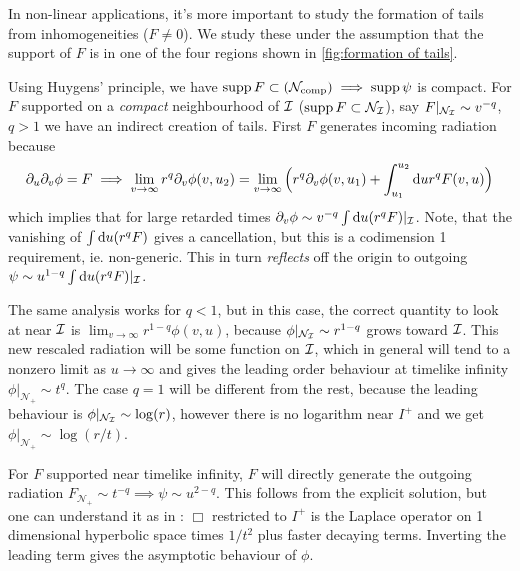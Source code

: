 \documentclass[11pt, oneside]{amsart}
\begin{document}
	In non-linear applications, it's more important to study the formation of tails from inhomogeneities ($F\neq0$). We study these under the assumption that the support of $F$ is in one of the four regions shown in \cref{fig:formation of tails}. 
	
	Using Huygens' principle, we have $\operatorname{supp} F \subset(\mathcal{N}_{\text{comp}})\implies\operatorname{supp}\psi$ is compact. For $F$ supported on a \textit{compact} neighbourhood of  $\mathcal{I}$ ($\operatorname{supp} F\subset \mathcal{N}_{\mathcal{I}}$), say $F|_{\mathcal{N}_{\mathcal{I}}}\sim v^{-q}$, $q>1$ we have an indirect creation of tails. First $F$ generates incoming radiation because 
	\begin{equation*}
		\begin{gathered}
			\partial_u\partial_v\phi=F
			\implies \lim_{v\to\infty}r^q\partial_v\phi(v,u_2)=\lim_{v\to\infty}\Big(r^q\partial_v\phi(v,u_1)+\int_{u_1}^{u_2}\mathrm{d} u r^qF(v,u)\Big)
		\end{gathered}
	\end{equation*}
	which implies that for large retarded times $\partial_v\phi\sim v^{-q}\int\mathrm{d} u (r^qF)|_{\mathcal{I}}$. Note, that the vanishing of $\int\mathrm{d} u (r^qF)$ gives a cancellation, but this is a codimension 1 requirement, ie. non-generic. This in turn \textit{reflects} off the origin to outgoing $\psi\sim u^{1-q}\int\mathrm{d} u (r^qF)|_{\mathcal{I}}$. 
	\begin{remark}\label{log from scri}
		The same analysis works for $q<1$, but in this case, the correct quantity to look at near $\mathcal{I}$ is $\lim_{v\to\infty} r^{1-q}\phi(v,u)$, because $\phi|_{\mathcal{N}_{\mathcal{I}}}\sim r^{1-q}$ grows toward $\mathcal{I}$. This new rescaled radiation will be some function on $\mathcal{I}$, which in general will tend to a nonzero limit as $u\to\infty$ and gives the leading order behaviour at timelike infinity $\phi|_{\mathcal{N}_+}\sim t^q$. The case $q=1$ will be different from the rest, because the leading behaviour is $\phi|_{\mathcal{N}_{\mathcal{I}}}\sim \log(r)$, however there is no logarithm near $I^+$ and we get  $\phi|_{\mathcal{N}_+}\sim \log(r/t)$.
	\end{remark}
	
	For $F$ supported near timelike infinity, $F$ will directly generate the outgoing radiation $F_{\mathcal{N}_+}\sim t^{-q}\implies \psi\sim u^{2-q}$. This follows from the explicit solution, but one can understand it as in \cite{baskin_asymptotics_2018}: $\Box$ restricted to $I^+$ is the Laplace operator on 1 dimensional hyperbolic space times $1/t^2$ plus faster decaying terms. Inverting the leading term gives the asymptotic behaviour of $\phi$. 
	
\end{document}
